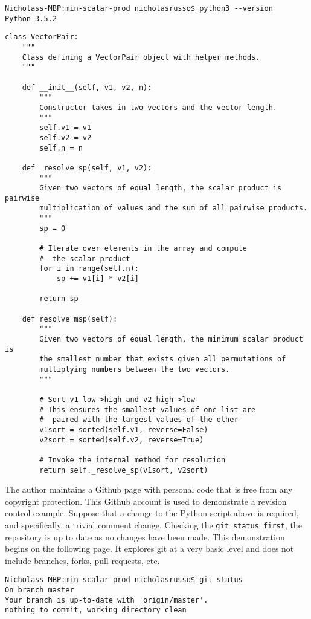 \begin{verbatim}
Nicholass-MBP:min-scalar-prod nicholasrusso$ python3 --version
Python 3.5.2
\end{verbatim}

\begin{verbatim}
class VectorPair:
    """
	Class defining a VectorPair object with helper methods.
	"""

    def __init__(self, v1, v2, n):
        """
        Constructor takes in two vectors and the vector length.
        """
        self.v1 = v1
        self.v2 = v2
        self.n = n

    def _resolve_sp(self, v1, v2):
        """
        Given two vectors of equal length, the scalar product is pairwise
        multiplication of values and the sum of all pairwise products.
        """
        sp = 0

        # Iterate over elements in the array and compute
        #  the scalar product
        for i in range(self.n):
            sp += v1[i] * v2[i]

        return sp

    def resolve_msp(self):
        """
        Given two vectors of equal length, the minimum scalar product is
        the smallest number that exists given all permutations of
        multiplying numbers between the two vectors.
        """

        # Sort v1 low->high and v2 high->low
        # This ensures the smallest values of one list are
        #  paired with the largest values of the other
        v1sort = sorted(self.v1, reverse=False)
        v2sort = sorted(self.v2, reverse=True)

        # Invoke the internal method for resolution
        return self._resolve_sp(v1sort, v2sort)
\end{verbatim}

The author maintains a Github page with personal code that is free from any
copyright protection. This Github account is used to demonstrate a revision
control example. Suppose that a change to the Python script above is required,
and specifically, a trivial comment change. Checking the \verb|git status first|,
the repository is up to date as no changes have been made. This demonstration
begins on the following page. It explores git at a very basic level and does
not include branches, forks, pull requests, etc.

\begin{verbatim}
Nicholass-MBP:min-scalar-prod nicholasrusso$ git status
On branch master
Your branch is up-to-date with 'origin/master'.
nothing to commit, working directory clean
\end{verbatim}

